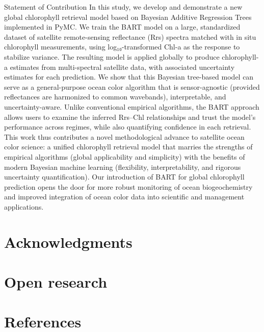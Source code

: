 \documentclass[
]{agujournal2019}
\begin{document}
Statement of Contribution In this study, we develop and demonstrate a
new global chlorophyll retrieval model based on Bayesian Additive
Regression Trees implemented in PyMC. We train the BART model on a
large, standardized dataset of satellite remote-sensing reflectance
(Rrs) spectra matched with in situ chlorophyll measurements, using
log₁₀-transformed Chl-a as the response to stabilize variance. The
resulting model is applied globally to produce chlorophyll-a estimates
from multi-spectral satellite data, with associated uncertainty
estimates for each prediction. We show that this Bayesian tree-based
model can serve as a general-purpose ocean color algorithm that is
sensor-agnostic (provided reflectances are harmonized to common
wavebands), interpretable, and uncertainty-aware. Unlike conventional
empirical algorithms, the BART approach allows users to examine the
inferred Rrs--Chl relationships and trust the model's performance across
regimes, while also quantifying confidence in each retrieval. This work
thus contributes a novel methodological advance to satellite ocean color
science: a unified chlorophyll retrieval model that marries the
strengths of empirical algorithms (global applicability and simplicity)
with the benefits of modern Bayesian machine learning (flexibility,
interpretability, and rigorous uncertainty quantification). Our
introduction of BART for global chlorophyll prediction opens the door
for more robust monitoring of ocean biogeochemistry and improved
integration of ocean color data into scientific and management
applications.

\section{Acknowledgments}\label{acknowledgments}

\section{Open research}\label{open-research}

\section*{References}\label{references}
\end{document}

